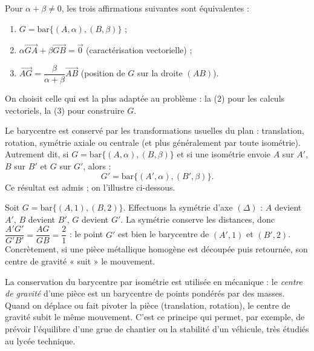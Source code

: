 \documentclass[11pt]{article}
\newcommand{\cle}[1]{{\popxbold\color{popdark}#1}}
\newcounter{popsec}
\newcounter{popsub}
\newcommand{\courssub}[1]{%
  \stepcounter{popsub}%
  \par\vspace{9pt}\noindent{\popxbold\fontsize{11.5}{13}\selectfont\color{popink}{\color{poporange}\thepopsec.\thepopsub}\hspace{6pt}#1}\par\nopagebreak\vspace{4pt}
}
\begin{document}
\begin{aretenir}
Pour $\alpha+\beta\neq 0$, les trois affirmations suivantes sont équivalentes :
\begin{enumerate}
\item $G=\text{bar}\{(A,\alpha),(B,\beta)\}$ ;
\item $\alpha\overrightarrow{GA}+\beta\overrightarrow{GB}=\vec{0}$ (caractérisation vectorielle) ;
\item $\overrightarrow{AG}=\dfrac{\beta}{\alpha+\beta}\overrightarrow{AB}$ (position de $G$ sur la droite $(AB)$).
\end{enumerate}
On choisit celle qui est la plus adaptée au problème : la (2) pour les calculs vectoriels, la (3) pour construire $G$.
\end{aretenir}

\courssub{Invariance par isométrie}

\begin{propriete}
Le barycentre est conservé par les transformations usuelles du plan : \cle{translation}, \cle{rotation}, \cle{symétrie} axiale ou centrale (et plus généralement par toute isométrie). Autrement dit, si $G=\text{bar}\{(A,\alpha),(B,\beta)\}$ et si une isométrie envoie $A$ sur $A'$, $B$ sur $B'$ et $G$ sur $G'$, alors :
\[
G'=\text{bar}\{(A',\alpha),(B',\beta)\}.
\]
Ce résultat est admis ; on l'illustre ci-dessous.
\end{propriete}

\begin{exemplebox}
Soit $G=\text{bar}\{(A,1),(B,2)\}$. Effectuons la symétrie d'axe $(\Delta)$ : $A$ devient $A'$, $B$ devient $B'$, $G$ devient $G'$. La symétrie conserve les distances, donc $\dfrac{A'G'}{G'B'}=\dfrac{AG}{GB}=\dfrac{2}{1}$ : le point $G'$ est bien le barycentre de $(A',1)$ et $(B',2)$. Concrètement, si une pièce métallique homogène est découpée puis retournée, son centre de gravité « suit » le mouvement.
\end{exemplebox}

\begin{savaistu}
La conservation du barycentre par isométrie est utilisée en mécanique : le \emph{centre de gravité} d'une pièce est un barycentre de points pondérés par des masses. Quand on déplace ou fait pivoter la pièce (translation, rotation), le centre de gravité subit le même mouvement. C'est ce principe qui permet, par exemple, de prévoir l'équilibre d'une grue de chantier ou la stabilité d'un véhicule, très étudiés au lycée technique.
\end{savaistu}
\end{document}
